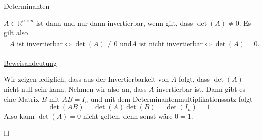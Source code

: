 \documentclass[
  8pt,
  ignorenonframetext,
]{beamer}
\begin{document}
\begin{frame}{Determinanten}
\protect\hypertarget{determinanten-6}{}
\small
\begin{theorem}
\normalfont
$A \in \mathbb{R}^{n \times n}$ ist dann und nur dann invertierbar, wenn gilt,
dass $\det(A) \neq 0$. Es gilt also
\begin{align}
\begin{split}
A \mbox{ ist invertierbar} \Leftrightarrow \det(A) \neq 0
\mbox{ und}
A \mbox{ ist nicht invertierbar} \Leftrightarrow \det(A) = 0.
\end{split}
\end{align}
\end{theorem}

\footnotesize

\underline{Beweisandeutung} \vspace{1mm}

Wir zeigen lediglich, dass aus der Invertierbarkeit von \(A\) folgt,
dass \(\det(A)\) nicht null sein kann. Nehmen wir also an, dass \(A\)
invertierbar ist. Dann gibt es eine Matrix \(B\) mit \(AB = I_n\) und
mit dem Determinantenmultiplikationssatz folgt \begin{equation}
\det(AB) = \det(A)\det(B) = \det(I_n) = 1.
\end{equation} Also kann \(\det(A) = 0\) nicht gelten, denn sonst wäre
\(0 = 1\).

\(\hfill\Box\)
\end{frame}
\end{document}
